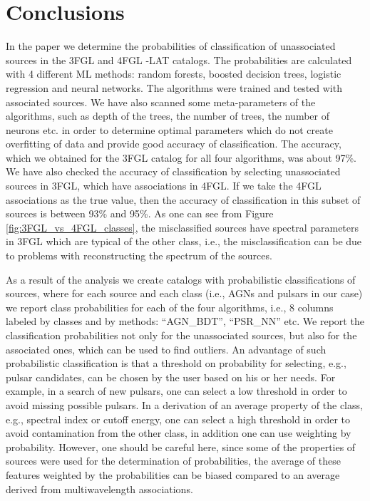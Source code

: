 \section{Conclusions}

In the paper we determine the probabilities of classification of unassociated sources in the 3FGL and 4FGL \Fermi-LAT catalogs.
The probabilities are calculated with 4 different ML methods: random forests, boosted decision trees, logistic regression and neural networks.
The algorithms were trained and tested with associated sources.
We have also scanned some meta-parameters of the algorithms, such as depth of the trees, the number of trees, the number of neurons etc. in order to determine optimal parameters which do not create overfitting of data and provide good accuracy of classification.
The accuracy, which we obtained for the 3FGL catalog for all four algorithms, was about 97\%.
We have also checked the accuracy of classification by selecting unassociated sources in 3FGL, which have associations in 4FGL.
If we take the 4FGL associations as the true value, then the accuracy of classification in this subset of sources is between 93\% and 95\%.
As one can see from Figure \ref{fig:3FGL_vs_4FGL_classes}, the misclassified sources have spectral parameters in 3FGL which are typical of the other class, i.e., the misclassification can be due to problems with reconstructing the spectrum of the sources.

As a result of the analysis we create catalogs with probabilistic classifications of sources, where for each source and each class (i.e., AGNs and pulsars in our case) we report class probabilities for each of the four algorithms, i.e., 8 columns labeled by classes and by methods: ``AGN\_BDT'', ``PSR\_NN'' etc.
We report the classification probabilities not only for the unassociated sources, but also for the associated ones, which can be used to find outliers.
An advantage of such probabilistic classification is that a threshold on probability for selecting, e.g., pulsar candidates, can be chosen by the user based on his or her needs.
For example, in a search of new pulsars, one can select a low threshold in order to avoid missing possible pulsars.
In a derivation of an average property of the class, e.g., spectral index or cutoff energy, one can select a high threshold in order to avoid contamination from the other class, in addition one can use weighting by probability.
However, one should be careful here, since some of the properties of sources were used for the determination of probabilities,
the average of these features weighted by the probabilities can be biased compared to an average derived from multiwavelength associations.

